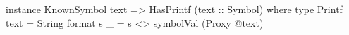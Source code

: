 \begin{code}
instance KnownSymbol text => HasPrintf (text :: Symbol) where
  type Printf text = String
  format s _ = s <> symbolVal (Proxy @text)
\end{code}
